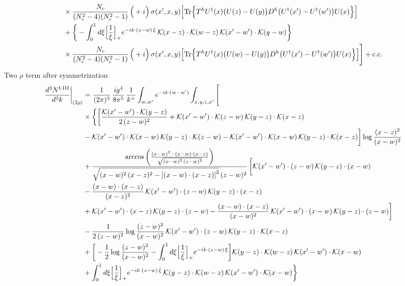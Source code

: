 \documentclass[9pt]{article}
\numberwithin{equation}{section}
\begin{document}
\begin{align}
&\times \frac{N_{c}}{(N_{c}^{2}-4)(N_{c}^{2}-1)}\,\Big(+i\Big)\,\sigma(x',x,y)\Big[{\rm Tr}\Big\{T^{h}U^{\dagger}(x)\big(U(z)-U(y)\big)D^{h}\big(U^{\dagger}(x')-U^{\dagger}(w')\big)U(x)\Big\}\Big]\notag\\
&+\bigg\{-\int_{0}^{1}d\xi\Big[\frac{1}{\xi}\Big]_{+}e^{-ik\cdot(z-w)\,\xi}\,\mathcal{K}(x-z)\cdot\mathcal{K}(w-z)\,\mathcal{K}(x'-w')\cdot\mathcal{K}(y-w)\bigg\}\notag\\
&\times \frac{N_{c}}{(N_{c}^{2}-4)(N_{c}^{2}-1)}\,\Big(+i\Big)\,\sigma(x',x,y)\Big[{\rm Tr}\Big\{T^{h}U^{\dagger}(x)\big(U(w)-U(y)\big)D^{h}\big(U^{\dagger}(x')-U^{\dagger}(w')\big)U(x)\Big\}\Big]\Bigg]+{\rm c.c.}\label{eq:S-I.III-3}
\end{align}
Two $\rho$ term after symmetrization
\begin{align}
\frac{d^{3}N^{\rm I.III}}{d^{3}k}\bigg|_{(2\rho)}&=\frac{1}{(2\pi)^{3}}\,\frac{ig^{4}}{8\pi^{5}}\,\frac{1}{k^{+}}\int_{w,w'}e^{-ik\cdot(w-w')}\int_{x,y,z,x'}\Bigg[\notag\\
&\times\bigg\{\bigg[\frac{\mathcal{K}(x'-w')\cdot\mathcal{K}(y-z)}{2\,(z-w)^{2}}+\mathcal{K}(x'-w')\cdot\mathcal{K}(z-w)\,\mathcal{K}(y-z)\cdot\mathcal{K}(x-z)\notag\\
&-\mathcal{K}(x'-w')\cdot\mathcal{K}(x-w)\,\mathcal{K}(y-z)\cdot\mathcal{K}(z-w)-\mathcal{K}(x'-w')\cdot\mathcal{K}(x-w)\,\mathcal{K}(y-z)\cdot\mathcal{K}(x-z)\bigg]\log\frac{(x-z)^{2}}{(x-w)^{2}}\notag\\
&+\frac{\arccos\left(\frac{(x-w)^{2}-(x-w)\cdot (x-z)}{\sqrt{(x-w)^{2}\,(z-w)^{2}}}\right)}{\sqrt{(x-w)^{2}\,(x-z)^{2}-\left[(x-w)\cdot (x-z)\right]^{2}}\,(z-w)^{2}}\,\bigg[\mathcal{K}(x'-w')\cdot(z-w)\,\mathcal{K}(y-z)\cdot(x-w)\notag\\
&-\frac{(x-w)\cdot(x-z)}{(x-z)^{2}}\,\mathcal{K}(x'-w')\cdot(z-w)\,\mathcal{K}(y-z)\cdot(x-z)\notag\\
&+\mathcal{K}(x'-w')\cdot(x-z)\,\mathcal{K}(y-z)\cdot(z-w)-\frac{(x-w)\cdot(x-z)}{(x-w)^{2}}\,\mathcal{K}(x'-w')\cdot(x-w)\,\mathcal{K}(y-z)\cdot(z-w)\bigg]\notag\\
&-\frac{1}{2\,(z-w)^{2}}\log\frac{(z-w)^{2}}{(x-w)^{2}}\,\mathcal{K}(x'-w')\cdot(z-w)\,\mathcal{K}(y-z)\cdot\mathcal{K}(x-z)\notag\\
&+\bigg[-\frac{1}{2}\log\frac{(z-w)^{2}}{(x-w)^{2}}-\int_{0}^{1}d\xi\Big[\frac{1}{\xi}\Big]_{+}e^{-ik\cdot(z-w)\,\xi}\bigg]\mathcal{K}(y-z)\cdot\mathcal{K}(w-z)\,\mathcal{K}(x'-w')\cdot\mathcal{K}(x-w)\notag\\
&+\int_{0}^{1}d\xi\Big[\frac{1}{\xi}\Big]_{+}e^{-ik\cdot(z-w)\,\xi}\,\mathcal{K}(y-z)\cdot\mathcal{K}(w-z)\,\mathcal{K}(x'-w')\cdot\mathcal{K}(x-w)\bigg\}\notag\\

\end{align}
\end{document}
